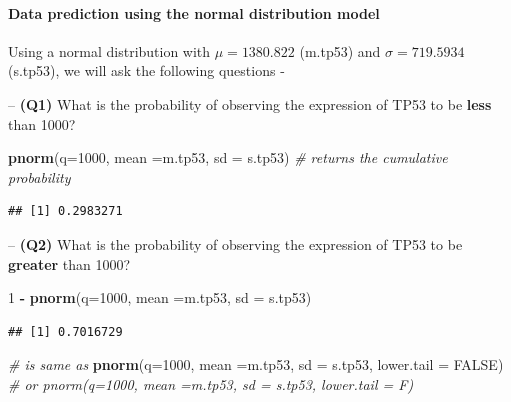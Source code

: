 \documentclass[
]{book}
\newenvironment{Shaded}{\begin{snugshade}}{\end{snugshade}}
\newcommand{\AttributeTok}[1]{\textcolor[rgb]{0.13,0.29,0.53}{#1}}
\newcommand{\CommentTok}[1]{\textcolor[rgb]{0.56,0.35,0.01}{\textit{#1}}}
\newcommand{\ConstantTok}[1]{\textcolor[rgb]{0.56,0.35,0.01}{#1}}
\newcommand{\DecValTok}[1]{\textcolor[rgb]{0.00,0.00,0.81}{#1}}
\newcommand{\FunctionTok}[1]{\textcolor[rgb]{0.13,0.29,0.53}{\textbf{#1}}}
\newcommand{\NormalTok}[1]{#1}
\newcommand{\SpecialCharTok}[1]{\textcolor[rgb]{0.81,0.36,0.00}{\textbf{#1}}}
\begin{document}
\hypertarget{data-prediction-using-the-normal-distribution-model}{%
\paragraph{Data prediction using the normal distribution model}\label{data-prediction-using-the-normal-distribution-model}}

Using a normal distribution with \(\mu = 1380.822\) (m.tp53) and \(\sigma = 719.5934\) (s.tp53), we will ask the following questions -

-- \textbf{(Q1)} What is the probability of observing the expression of TP53 to be \textbf{less} than 1000?

\begin{Shaded}
\begin{Highlighting}[]
\FunctionTok{pnorm}\NormalTok{(}\AttributeTok{q=}\DecValTok{1000}\NormalTok{, }\AttributeTok{mean =}\NormalTok{m.tp53, }\AttributeTok{sd =}\NormalTok{ s.tp53) }\CommentTok{\# returns the cumulative probability}
\end{Highlighting}
\end{Shaded}

\begin{verbatim}
## [1] 0.2983271
\end{verbatim}

-- \textbf{(Q2)} What is the probability of observing the expression of TP53 to be \textbf{greater} than 1000?

\begin{Shaded}
\begin{Highlighting}[]
\DecValTok{1} \SpecialCharTok{{-}} \FunctionTok{pnorm}\NormalTok{(}\AttributeTok{q=}\DecValTok{1000}\NormalTok{, }\AttributeTok{mean =}\NormalTok{m.tp53, }\AttributeTok{sd =}\NormalTok{ s.tp53) }
\end{Highlighting}
\end{Shaded}

\begin{verbatim}
## [1] 0.7016729
\end{verbatim}

\begin{Shaded}
\begin{Highlighting}[]
\CommentTok{\# is same as}
\FunctionTok{pnorm}\NormalTok{(}\AttributeTok{q=}\DecValTok{1000}\NormalTok{, }\AttributeTok{mean =}\NormalTok{m.tp53, }\AttributeTok{sd =}\NormalTok{ s.tp53, }\AttributeTok{lower.tail =} \ConstantTok{FALSE}\NormalTok{) }\CommentTok{\# or pnorm(q=1000, mean =m.tp53, sd = s.tp53, lower.tail = F)}
\end{Highlighting}
\end{Shaded}
\end{document}
